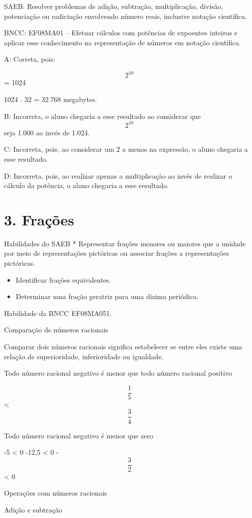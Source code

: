 SAEB: Resolver problemas de adição, subtração, multiplicação, divisão,
potenciação ou radiciação envolvendo número reais, inclusive notação
científica.

BNCC: EF08MA01 -- Efetuar cálculos com potências de expoentes inteiros e
aplicar esse conhecimento na representação de números em notação
científica.

A: Correta, pois:

\[2^10\] = 1024

1024 . 32 = 32.768 megabytes.

B: Incorreta, o aluno chegaria a esse resultado ao considerar que
\[2^{10}\] seja 1.000 ao invés de 1.024.

C: Incorreta, pois, ao considerar um 2 a menos na expressão, o aluno
chegaria a esse resultado.

D: Incorreta, pois, ao realizar apenas a multiplicação ao invés de
realizar o cálculo da potência, o aluno chegaria a esse resultado.


\section{3. Frações}

Habilidades do SAEB * Representar frações menores ou maiores que a
unidade por meio de representações pictóricas ou associar frações a
representações pictóricas.

\begin{itemize}
\item
  Identificar frações equivalentes.
\item
  Determinar uma fração geratriz para uma dízima periódica.
\end{itemize}

Habilidade da BNCC EF08MA051.

Comparação de números racionais

Comparar dois números racionais significa estabelecer se entre eles
existe uma relação de superioridade, inferioridade ou igualdade.

Todo número racional negativo é menor que todo número racional positivo

\[\frac{1}{5}\] \textless{} \[\frac{3}{4}\]

Todo número racional negativo é menor que zero

-5 \textless{} 0 -12,5 \textless{} 0 -\[\frac{3}{2}\] \textless{} 0

Operações com números racionais

Adição e subtração

